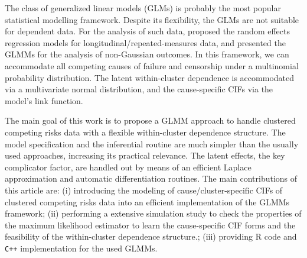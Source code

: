 \documentclass[oupdraft]{bio}
\begin{document}
The class of generalized linear models (GLMs) \citep{GLM72} is probably
the most popular statistical modelling framework. Despite its
flexibility, the GLMs are not suitable for dependent data. For the
analysis of such data, \cite{laird82} proposed the random effects
regression models for longitudinal/repeated-measures data, and
\cite{breslow93} presented the GLMMs for the analysis of non-Gaussian
outcomes. In this framework, we can accommodate all competing causes of
failure and censorship under a multinomial probability distribution. The
latent within-cluster dependence is accommodated via a multivariate
normal distribution, and the cause-specific CIFs via the model's link
function.

The main goal of this work is to propose a GLMM approach to handle
clustered competing risks data with a flexible within-cluster dependence
structure. The model specification and the inferential routine are much
simpler than the usually used approaches, increasing its practical
relevance. The latent effects, the key complicator factor, are handled
out by means of an efficient Laplace approximation and automatic
differentiation routines. The main contributions of this article are:
(i) introducing the modeling of cause/cluster-specific CIFs of clustered
competing risks data into an efficient implementation of the GLMMs
framework; (ii) performing a extensive simulation study to check the
properties of the maximum likelihood estimator to learn the
cause-specific CIF forms and the feasibility of the within-cluster
dependence structure.; (iii) providing R code and \texttt{C++}
implementation for the used GLMMs.




\end{document}
